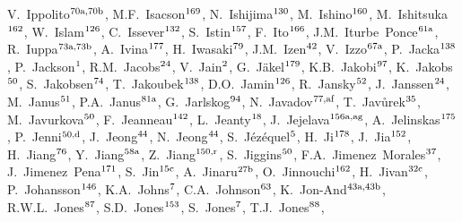\begin{flushleft}
V.~Ippolito$^\textrm{\scriptsize 70a,70b}$,    
M.F.~Isacson$^\textrm{\scriptsize 169}$,    
N.~Ishijima$^\textrm{\scriptsize 130}$,    
M.~Ishino$^\textrm{\scriptsize 160}$,    
M.~Ishitsuka$^\textrm{\scriptsize 162}$,    
W.~Islam$^\textrm{\scriptsize 126}$,    
C.~Issever$^\textrm{\scriptsize 132}$,    
S.~Istin$^\textrm{\scriptsize 157}$,    
F.~Ito$^\textrm{\scriptsize 166}$,    
J.M.~Iturbe~Ponce$^\textrm{\scriptsize 61a}$,    
R.~Iuppa$^\textrm{\scriptsize 73a,73b}$,    
A.~Ivina$^\textrm{\scriptsize 177}$,    
H.~Iwasaki$^\textrm{\scriptsize 79}$,    
J.M.~Izen$^\textrm{\scriptsize 42}$,    
V.~Izzo$^\textrm{\scriptsize 67a}$,    
P.~Jacka$^\textrm{\scriptsize 138}$,    
P.~Jackson$^\textrm{\scriptsize 1}$,    
R.M.~Jacobs$^\textrm{\scriptsize 24}$,    
V.~Jain$^\textrm{\scriptsize 2}$,    
G.~J\"akel$^\textrm{\scriptsize 179}$,    
K.B.~Jakobi$^\textrm{\scriptsize 97}$,    
K.~Jakobs$^\textrm{\scriptsize 50}$,    
S.~Jakobsen$^\textrm{\scriptsize 74}$,    
T.~Jakoubek$^\textrm{\scriptsize 138}$,    
D.O.~Jamin$^\textrm{\scriptsize 126}$,    
R.~Jansky$^\textrm{\scriptsize 52}$,    
J.~Janssen$^\textrm{\scriptsize 24}$,    
M.~Janus$^\textrm{\scriptsize 51}$,    
P.A.~Janus$^\textrm{\scriptsize 81a}$,    
G.~Jarlskog$^\textrm{\scriptsize 94}$,    
N.~Javadov$^\textrm{\scriptsize 77,af}$,    
T.~Jav\r{u}rek$^\textrm{\scriptsize 35}$,    
M.~Javurkova$^\textrm{\scriptsize 50}$,    
F.~Jeanneau$^\textrm{\scriptsize 142}$,    
L.~Jeanty$^\textrm{\scriptsize 18}$,    
J.~Jejelava$^\textrm{\scriptsize 156a,ag}$,    
A.~Jelinskas$^\textrm{\scriptsize 175}$,    
P.~Jenni$^\textrm{\scriptsize 50,d}$,    
J.~Jeong$^\textrm{\scriptsize 44}$,    
N.~Jeong$^\textrm{\scriptsize 44}$,    
S.~J\'ez\'equel$^\textrm{\scriptsize 5}$,    
H.~Ji$^\textrm{\scriptsize 178}$,    
J.~Jia$^\textrm{\scriptsize 152}$,    
H.~Jiang$^\textrm{\scriptsize 76}$,    
Y.~Jiang$^\textrm{\scriptsize 58a}$,    
Z.~Jiang$^\textrm{\scriptsize 150,r}$,    
S.~Jiggins$^\textrm{\scriptsize 50}$,    
F.A.~Jimenez~Morales$^\textrm{\scriptsize 37}$,    
J.~Jimenez~Pena$^\textrm{\scriptsize 171}$,    
S.~Jin$^\textrm{\scriptsize 15c}$,    
A.~Jinaru$^\textrm{\scriptsize 27b}$,    
O.~Jinnouchi$^\textrm{\scriptsize 162}$,    
H.~Jivan$^\textrm{\scriptsize 32c}$,    
P.~Johansson$^\textrm{\scriptsize 146}$,    
K.A.~Johns$^\textrm{\scriptsize 7}$,    
C.A.~Johnson$^\textrm{\scriptsize 63}$,    
K.~Jon-And$^\textrm{\scriptsize 43a,43b}$,    
R.W.L.~Jones$^\textrm{\scriptsize 87}$,    
S.D.~Jones$^\textrm{\scriptsize 153}$,    
S.~Jones$^\textrm{\scriptsize 7}$,    
T.J.~Jones$^\textrm{\scriptsize 88}$,    

\end{flushleft}
